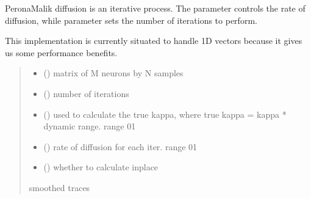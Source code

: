\documentclass[letterpaper,10pt,english]{sphinxmanual}
\begin{document}
\begin{fulllineitems}
\sphinxAtStartPar
Perona\sphinxhyphen{}Malik diffusion is an iterative process. The parameter  controls the rate of diffusion, while
parameter  sets the number of iterations to perform.

\sphinxAtStartPar
This implementation is currently situated to handle 1\sphinxhyphen{}D vectors because it gives us some performance benefits.
\begin{quote}\begin{description}
\begin{itemize}
\item {} 
\sphinxAtStartPar
{} () \textendash{} matrix of M neurons by N samples

\item {} 
\sphinxAtStartPar
{} () \textendash{} number of iterations

\item {} 
\sphinxAtStartPar
{} () \textendash{} used to calculate the true kappa, where true kappa = kappa * dynamic range. range 0\sphinxhyphen{}1

\item {} 
\sphinxAtStartPar
{} () \textendash{} rate of diffusion for each iter. range 0\sphinxhyphen{}1

\item {} 
\sphinxAtStartPar
{} () \textendash{} whether to calculate in\sphinxhyphen{}place

\end{itemize}

\sphinxAtStartPar
smoothed traces

\sphinxAtStartPar
{}

\end{description}\end{quote}

\end{fulllineitems}
\end{document}
